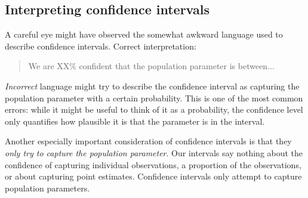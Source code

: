 \subsection{Interpreting confidence intervals}
\label{interpretingCIs}


A careful eye might have observed the somewhat awkward language used to describe confidence intervals. Correct interpretation:
\begin{quote}
We are XX\% confident that the population parameter is between...
\end{quote}
\emph{Incorrect} language might try to describe the confidence interval as capturing the population parameter with a certain probability. This is one of the most common errors: while it might be useful to think of it as a probability, the confidence level only quantifies how plausible it is that the parameter is in the interval.

Another especially important consideration of confidence intervals is that they \emph{only try to capture the population parameter}. Our intervals say nothing about the confidence of capturing individual observations, a proportion of the observations, or about capturing point estimates. Confidence intervals only attempt to capture population parameters.




